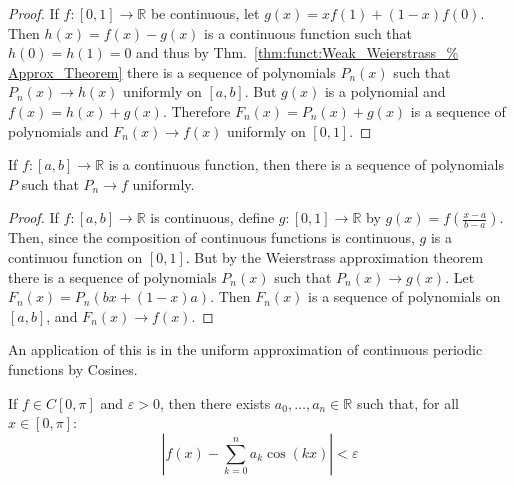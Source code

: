 \documentclass[crop=false,class=book,oneside]{standalone}
\begin{document}
            \begin{proof}
                If $f:[0,1]\rightarrow\mathbb{R}$ be
                continuous, let
                $g(x)=xf(1)+(1-x)f(0)$. Then
                $h(x)=f(x)-g(x)$ is a continuous function
                such that $h(0)=h(1)=0$ and thus by
                Thm.~\ref{thm:funct:Weak_Weierstrass_%
                          Approx_Theorem}
                there is a sequence of polynomials
                $P_{n}(x)$ such that
                $P_{n}(x)\rightarrow{h(x)}$
                uniformly on $[a,b]$.
                But $g(x)$ is a polynomial and
                $f(x)=h(x)+g(x)$. Therefore
                $F_{n}(x)=P_{n}(x)+g(x)$ is a sequence
                of polynomials and
                $F_{n}(x)\rightarrow{f(x)}$
                uniformly on $[0,1]$.
            \end{proof}
            \begin{theorem}
                If $f:[a,b]\rightarrow\mathbb{R}$ is a
                continuous function, then there is a sequence
                of polynomials $P$ such that
                $P_{n}\rightarrow{f}$ uniformly.
            \end{theorem}
            \begin{proof}
                If $f:[a,b]\rightarrow\mathbb{R}$ is
                continuous, define
                $g:[0,1]\rightarrow\mathbb{R}$ by
                $g(x)=f(\frac{x-a}{b-a})$. Then, since
                the composition of continuous functions
                is continuous, $g$ is a continuou function
                on $[0,1]$. But by the Weierstrass
                approximation theorem there is a sequence
                of polynomials $P_{n}(x)$ such that
                $P_{n}(x)\rightarrow{g(x)}$. Let
                $F_{n}(x)=P_{n}(bx+(1-x)a)$. Then
                $F_{n}(x)$ is a sequence of polynomials
                on $[a,b]$, and $F_{n}(x)\rightarrow{f(x)}$.
            \end{proof}
            An application of this is in the uniform
            approximation of continuous periodic functions
            by Cosines.
        \begin{theorem}
            If $f\in{C[0,\pi]}$ and $\varepsilon>0$,
            then there exists
            $a_{0},\hdots,a_{n}\in\mathbb{R}$ such that, for all
            $x\in[0,\pi]$:
            \begin{equation}
                |f(x)-\sum_{k=0}^{n}a_{k}\cos(kx)|
                <\varepsilon
            \end{equation}
        \end{theorem}
\end{document}
